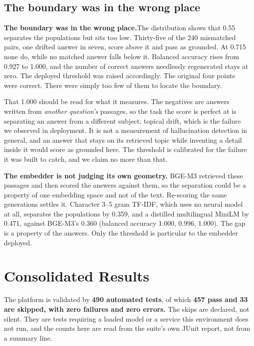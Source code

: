 \ifspringer\subsection{The boundary was in the wrong place}\else\textbf{The boundary was in the wrong place.}\fi The distribution shows that 0.55 separates the populations but sits too low. Thirty-five of the 240 mismatched pairs, one drifted answer in seven, score above it and pass as grounded. At 0.715 none do, while no matched answer falls below it. Balanced accuracy rises from 0.927 to 1.000, and the number of correct answers needlessly regenerated stays at zero. The deployed threshold was raised accordingly. The original four points were correct. There were simply too few of them to locate the boundary.

That 1.000 should be read for what it measures. The negatives are answers written from \emph{another question's} passages, so the task the score is perfect at is separating an answer from a different subject: topical drift, which is the failure we observed in deployment. It is not a measurement of hallucination detection in general, and an answer that stays on its retrieved topic while inventing a detail inside it would score as grounded here. The threshold is calibrated for the failure it was built to catch, and we claim no more than that.

\label{sec:grounding-indep}
\textbf{The embedder is not judging its own geometry.} BGE-M3 retrieved these passages and then scored the answers against them, so the separation could be a property of one embedding space and not of the text. Re-scoring the same generations settles it. Character 3--5 gram TF-IDF, which uses no neural model at all, separates the populations by 0.359, and a distilled multilingual MiniLM by 0.471, against BGE-M3's 0.360 (balanced accuracy 1.000, 0.996, 1.000). The gap is a property of the answers. Only the threshold is particular to the embedder deployed.

\ifconf\else  %
\section{Consolidated Results}

The platform is validated by \textbf{490 automated tests}, of which \textbf{457 pass and 33 are skipped, with zero failures and zero errors.} The skips are declared, not silent. They are tests requiring a loaded model or a service this environment does not run, and the counts here are read from the suite's own JUnit report, not from a summary line.

